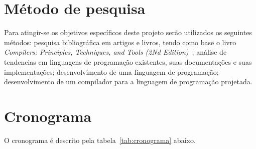\documentclass[
  12pt,
  openright,
  twoside,
  a4paper,
  english,
  brazil
]{abntex2}
\begin{document}
\chapter{Método de pesquisa}\label{cap:metodo_de_pesquisa}

Para atingir-se os objetivos específicos deste projeto serão utilizados os seguintes métodos:
pesquisa bibliográfica em artigos e livros, tendo como base o livro \textit{Compilers: Principles, Techniques, and Tools (2Nd Edition)}~\cite{Aho:2006:CPT:1177220};
análise de tendencias em linguagens de programação existentes, suas documentações e suas implementações;
desenvolvimento de uma linguagem de programação;
desenvolvimento de um compilador para a linguagem de programação projetada.

\chapter{Cronograma}\label{cap:cronograma}

O cronograma é descrito pela tabela~\ref{tab:cronograma} abaixo.

\begin{table}[h!]
  \caption{Planejamento das etapas do trabalho de conclusão de curso}\label{tab:cronograma}
\end{table}
\end{document}
